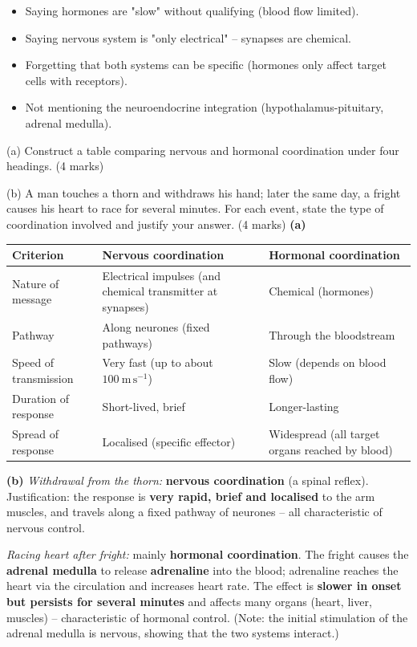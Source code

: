 \documentclass[11pt]{article}
\begin{document}
\begin{attention}
\begin{itemize}
\item Saying hormones are "slow" without qualifying (blood flow limited).
\item Saying nervous system is "only electrical" -- synapses are chemical.
\item Forgetting that both systems can be specific (hormones only affect target cells with receptors).
\item Not mentioning the neuroendocrine integration (hypothalamus-pituitary, adrenal medulla).
\end{itemize}
\end{attention}

\begin{exoresolu}
(a) Construct a table comparing nervous and hormonal coordination under four headings. \hfill (4 marks)\par
(b) A man touches a thorn and withdraws his hand; later the same day, a fright causes his heart to race for several minutes. For each event, state the type of coordination involved and justify your answer. \hfill (4 marks)
\tcblower
\textbf{(a)}
\begin{center}
\begin{tabularx}{\linewidth}{|l|X|X|}
\hline
\rowcolor{popblueL} \textbf{Criterion} & \textbf{Nervous coordination} & \textbf{Hormonal coordination} \\
\hline
Nature of message & Electrical impulses (and chemical transmitter at synapses) & Chemical (hormones) \\
\hline
Pathway & Along neurones (fixed pathways) & Through the bloodstream \\
\hline
Speed of transmission & Very fast (up to about $100\ \mathrm{m\,s^{-1}}$) & Slow (depends on blood flow) \\
\hline
Duration of response & Short-lived, brief & Longer-lasting \\
\hline
Spread of response & Localised (specific effector) & Widespread (all target organs reached by blood) \\
\hline
\end{tabularx}
\end{center}
\textbf{(b)} \emph{Withdrawal from the thorn:} \textbf{nervous coordination} (a spinal reflex). Justification: the response is \textbf{very rapid, brief and localised} to the arm muscles, and travels along a fixed pathway of neurones -- all characteristic of nervous control.\par
\emph{Racing heart after fright:} mainly \textbf{hormonal coordination}. The fright causes the \textbf{adrenal medulla} to release \textbf{adrenaline} into the blood; adrenaline reaches the heart via the circulation and increases heart rate. The effect is \textbf{slower in onset but persists for several minutes} and affects many organs (heart, liver, muscles) -- characteristic of hormonal control. (Note: the initial stimulation of the adrenal medulla is nervous, showing that the two systems interact.)
\end{exoresolu}
\end{document}
